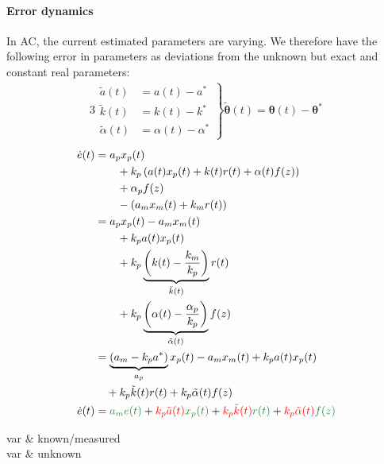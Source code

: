 \paragraph{Error dynamics}
In AC, the current estimated parameters are varying.
We therefore have
the following error in parameters
as deviations from the unknown but exact and constant
real parameters:
\begin{alignat*}{3}
\left.
\begin{array}{rl}
    \tilde{a}(t) &= a(t) - a^*\\
    \tilde{k}(t) &= k(t) - k^*\\
    \tilde{\alpha}(t) &= \alpha(t) - \alpha^*
\end{array}
\right\rbrace \tilde{\bm{\theta}}(t) = \bm{\theta}(t) - \bm{\theta}^*
\end{alignat*}%
%
\begin{alignat*}{3}
\dot{e}(t) &= a_p x_p(t)\\
        & \qquad + k_p \left( a(t) x_p(t) + k(t) r(t) + \alpha(t) f(z) \right)\\
        & \qquad + \alpha_p f(z)\\
        & \qquad - \left( a_m x_m(t) + k_m r(t) \right)\\
    &= a_p x_p(t) - a_m x_m(t)\\
        & \qquad + k_p a(t) x_p(t)\\
        & \qquad + k_p \underbrace{ \left(  k(t) - \frac{k_m}{k_p} \right) }_{ \tilde{k}(t)} r(t)\\
        & \qquad + k_p \underbrace{\left( \alpha(t) - \frac{\alpha_p}{k_p} \right)}_{\tilde{\alpha}(t)} f(z)\\
    &= \underbrace{\left( a_m - k_p a^* \right)}_{a_p} x_p(t)
        - a_m x_m(t) + k_p a(t) x_p(t)\\
        & \quad + k_p \tilde{k}(t) r(t)
        + k_p \tilde{\alpha}(t) f(z)\\
\dot{e}(t) &= \known{a_m e(t)}
        + \unknown{k_p \tilde{a}(t)} \known{x_p(t)}
        + \unknown{k_p \tilde{k}(t)} \known{r(t)}
        + \unknown{k_p \tilde{\alpha}(t)} \known{f(z)}
\end{alignat*}
\begin{variables}
\color{colKnown} var & known/measured\\
\color{red} var   & unknown\\
\end{variables}

